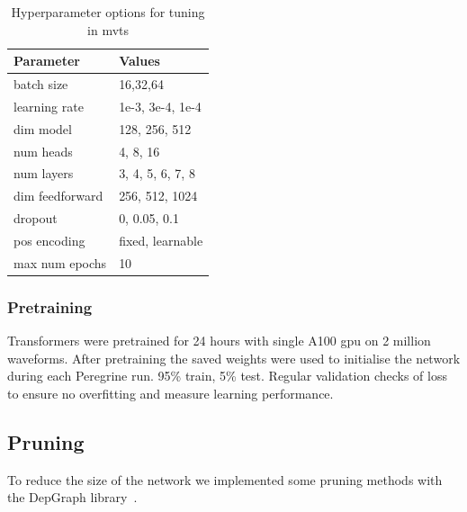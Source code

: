 \begin{table}[h]
    \centering
    \caption{Hyperparameter options for tuning in mvts}
    \label{tab:config_parameters}
    \begin{tabular}{@{}ll@{}}
    \toprule
    Parameter       & Values \\ 
    \midrule
    batch size & 16,32,64 \\
    learning rate & 1e-3, 3e-4, 1e-4 \\
    dim model & 128, 256, 512 \\
    num heads & 4, 8, 16 \\
    num layers & 3, 4, 5, 6, 7, 8 \\
    dim feedforward & 256, 512, 1024 \\
    dropout & 0, 0.05, 0.1 \\
    pos encoding & fixed, learnable \\
    max num epochs & 10 \\
    \end{tabular}
\end{table}

\subsubsection{Pretraining}

Transformers were pretrained for 24 hours with single A100 gpu on 2 million waveforms. After pretraining the saved weights were used to initialise the network during each Peregrine run. 95\% train, 5\% test. Regular validation checks of loss to ensure no overfitting and measure learning performance.


\subsection{Pruning}

To reduce the size of the network we implemented some pruning methods with the DepGraph library~\cite{Fang_Ma_Song_Mi_Wang_2023}.


